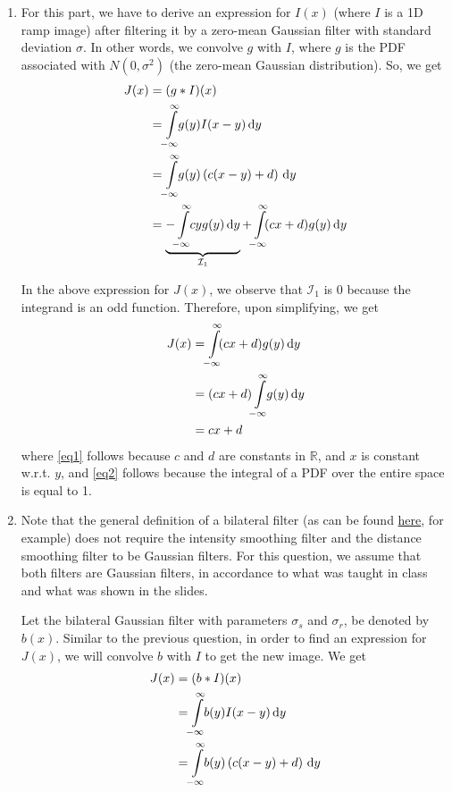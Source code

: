 \documentclass[a4paper]{article}
\newcommand{\R}{\mathbb{R}}
\begin{document}
\begin{enumerate}
\item For this part, we have to derive an expression for $I(x)$ (where $I$ is a 1D ramp image) after filtering it by a zero-mean Gaussian filter with standard deviation $\sigma$. In other words, we convolve $g$ with $I$, where $g$ is the PDF associated with $N(0, \sigma^2)$ (the zero-mean Gaussian distribution). So, we get
\begin{align*}
J(x) &= (g * I)(x) \\
&= \int\limits_{\mathclap{-\infty}}^{\mathclap{\infty}}\! g(y) I (x - y)\, \mathrm{d}y \\
&= \int\limits_{\mathclap{-\infty}}^{\mathclap{\infty}}\! g(y)\left ( c(x - y) + d\right )\, \mathrm{d}y \\
&= \underbrace{-\int\limits_{\mathclap{-\infty}}^{\mathclap{\infty}}\! c y g(y)\, \mathrm{d}y}_{\mathcal{I}_1} + \int\limits_{\mathclap{-\infty}}^{\mathclap{\infty}}\! (cx + d)g(y)\, \mathrm{d}y
\end{align*}

In the above expression for $J(x)$, we observe that $\mathcal{I}_1$ is 0 because the integrand is an odd function. Therefore, upon simplifying, we get
\begin{align}
J(x) &= \int\limits_{\mathclap{-\infty}}^{\mathclap{\infty}}\! (cx + d)g(y)\, \mathrm{d}y \nonumber \\
&=  (cx + d)\int\limits_{\mathclap{-\infty}}^{\mathclap{\infty}}\!g(y)\, \mathrm{d}y \label{eq1} \\
&= cx + d \label{eq2}
\end{align}
where \eqref{eq1} follows because $c$ and $d$ are constants in $\R$, and $x$ is constant w.r.t. $y$, and \eqref{eq2} follows because the integral of a PDF over the entire space is equal to 1.

\item Note that the general definition of a bilateral filter (as can be found \href{https://en.wikipedia.org/wiki/Bilateral_filter#Definition}{here}, for example) does not require the intensity smoothing filter and the distance smoothing filter to be Gaussian filters. For this question, we assume that both filters are Gaussian filters, in accordance to what was taught in class and what was shown in the slides.

Let the bilateral Gaussian filter with parameters $\sigma_s$ and $\sigma_r$, be denoted by $b(x)$. Similar to the previous question, in order to find an expression for $J(x)$, we will convolve $b$ with $I$ to get the new image. We get
\begin{align*}
J(x) &= (b * I)(x) \\
&= \int\limits_{\mathclap{-\infty}}^{\mathclap{\infty}}\! b(y) I (x - y)\, \mathrm{d}y \\
&= \int\limits_{\mathclap{-\infty}}^{\mathclap{\infty}}\! b(y)\left ( c(x - y) + d\right )\, \mathrm{d}y
\end{align*}


\end{enumerate}
\end{document}
